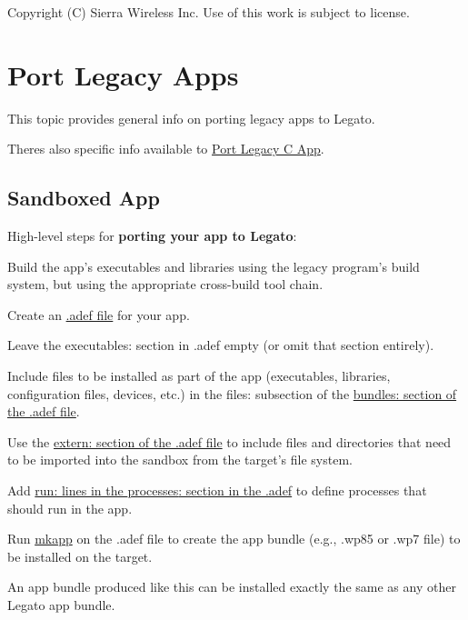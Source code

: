Copyright (C) Sierra Wireless Inc. Use of this work is subject to license. \hypertarget{howToPortLegacyGen}{}\section{Port Legacy Apps}\label{howToPortLegacyGen}
This topic provides general info on porting legacy apps to Legato.

There\textquotesingle{}s also specific info available to \hyperlink{howToPortLegacyC}{Port Legacy C App}.\hypertarget{how_to_port_legacy_gen_howToPortLegacyGen_Sandboxed}{}\subsection{Sandboxed App}\label{how_to_port_legacy_gen_howToPortLegacyGen_Sandboxed}
High-\/level steps for {\bfseries porting your app to Legato}\+:


\begin{DoxyItemize}
\item Build the app’s executables and libraries using the legacy program’s build system, but using the appropriate cross-\/build tool chain.
\item Create an \hyperlink{defFilesAdef}{.adef file} for your app.
\item Leave the {\ttfamily executables\+:} section in {\ttfamily  .adef } empty (or omit that section entirely).
\item Include files to be installed as part of the app (executables, libraries, configuration files, devices, etc.) in the {\ttfamily files\+:} subsection of the \hyperlink{def_files_adef_defFilesAdef_bundles}{bundles\+: section of the .adef file}.
\item Use the \hyperlink{def_files_adef_defFilesAdef_requiresFile}{extern\+: section of the .adef file} to include files and directories that need to be imported into the sandbox from the target’s file system.
\item Add \hyperlink{def_files_adef_defFilesAdef_processRun}{run\+: lines in the {\ttfamily processes}\+: section in the .adef} to define processes that should run in the app.
\item Run \hyperlink{buildToolsmkapp}{mkapp} on the {\ttfamily  .adef } file to create the app bundle (e.\+g., .wp85 or .wp7 file) to be installed on the target.
\end{DoxyItemize}

An app bundle produced like this can be installed exactly the same as any other Legato app bundle.

